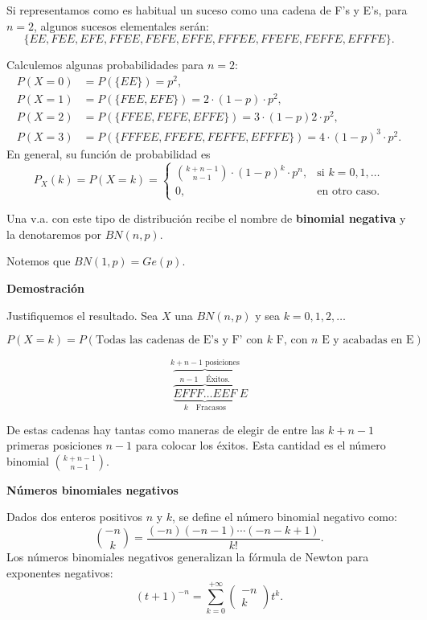 \documentclass[
  letterpaper,
  DIV=11,
  numbers=noendperiod]{scrreprt}
\begin{document}
Si representamos como es habitual un suceso como una cadena de F's y
E's, para \(n=2\), algunos sucesos elementales serán:
\[\{EE,FEE,EFE, FFEE,FEFE,EFFE,FFFEE,FFEFE,FEFFE,EFFFE\}.\]

Calculemos algunas probabilidades para \(n=2\): \[
\begin{array}{rl}
P(X=0) & =P(\{EE\})=p^2, \\
P(X=1) & =P(\{FEE,EFE\})=2\cdot (1-p)\cdot p^2, \\
P(X=2) & =P(\{FFEE,FEFE,EFFE\})=3\cdot (1-p) 2\cdot p^2, \\
P(X=3) & =P(\{FFFEE,FFEFE,FEFFE,EFFFE\})=4\cdot (1-p)^3\cdot p^2.
\end{array}
\] En general, su función de probabilidad es \[
P_{X}(k)=P(X=k)=\left\{\begin{array}{ll}
     {{k+n-1}\choose{n-1}} \cdot (1-p)^{k}\cdot p^n, & \mbox{si } k=0,1,\ldots\\
     0, & \mbox{en otro caso.}\end{array}\right.
\]

Una v.a. con este tipo de distribución recibe el nombre de
\textbf{binomial negativa} y la denotaremos por \(BN(n,p)\).

Notemos que \(BN(1,p)=Ge(p)\).

\textbf{Demostración}

Justifiquemos el resultado. Sea \(X\) una \(BN(n,p)\) y sea
\(k=0,1,2,\ldots\)

\[P(X=k)=P(\mbox{Todas las cadenas de E's y F' con $k$ F, con $n$ E y acabadas en E})\]

\[
\overbrace{\underbrace{\overbrace{EFFF\ldots EEF}^{n-1 \quad \mbox{Éxitos}.}}}_{k \quad\mbox{Fracasos}}^{k+n-1\mbox{ posiciones}}E
\]

De estas cadenas hay tantas como maneras de elegir de entre las
\(k+n-1\) primeras posiciones \(n-1\) para colocar los éxitos. Esta
cantidad es el número binomial \({k+n-1\choose n-1}\).

\textbf{Números binomiales negativos}

Dados dos enteros positivos \(n\) y \(k\), se define el número binomial
negativo como: \[\binom{-n}{k}=\frac{(-n)(-n-1)\cdots (-n-k+1)}{k!}.\]
Los números binomiales negativos generalizan la fórmula de Newton para
exponentes negativos: \[
(t+1)^{-n}=\sum_{k=0}^{+\infty}\left(\begin{array}{c} -n
\\ k\end{array}\right) t^{k}.
\]
\end{document}
